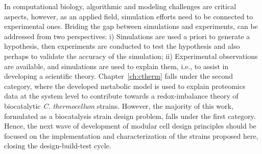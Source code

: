 
In computational biology, algorithmic and modeling challenges are critical aspects, however, as an applied field, simulation efforts need to be connected to experimental ones.
Briding the gap between simulations and experiments, can be addressed from two perspectives:
i) Simulations are used a priori to generate a hypothesis, then experiments are conducted to test the hypothesis and also perhaps to validate the accuracy of the simulation;
ii) Experimental observations are available, and simulations are used to explain them, i.e., to assist in developing a scientific theory.
Chapter~\ref{ch:ctherm} falls under the second category, where the developed metabolic model is used to explain proteomics data at the system level to contribute towards a redox-imbalance theory of biocatalytic \textit{C. thermocellum} strains. %
However, the majority of this work, formulated as a biocatalysis strain design problem, falls under the first category.
Hence, the next wave of development of modular cell design principles should be focused on the implementation and characterization of the strains proposed here, closing the design-build-test cycle.





